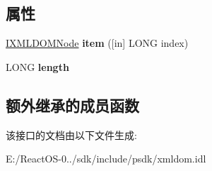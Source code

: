 \subsection*{属性}
\begin{DoxyCompactItemize}
\item 
\mbox{\label{interface_i_x_m_l_d_o_m_node_list_a688b5bc278ab5152e696c4aeb70abc20}} 
\hyperlink{interface_i_x_m_l_d_o_m_node}{I\+X\+M\+L\+D\+O\+M\+Node} {\bfseries item} (\mbox{[}in\mbox{]} L\+O\+NG index)
\item 
\mbox{\label{interface_i_x_m_l_d_o_m_node_list_ae2dab1aad930642ae87dc3b5b95e57cb}} 
L\+O\+NG {\bfseries length}
\end{DoxyCompactItemize}
\subsection*{额外继承的成员函数}


该接口的文档由以下文件生成\+:\begin{DoxyCompactItemize}
\item 
E\+:/\+React\+O\+S-\/0../sdk/include/psdk/xmldom.\+idl\end{DoxyCompactItemize}
